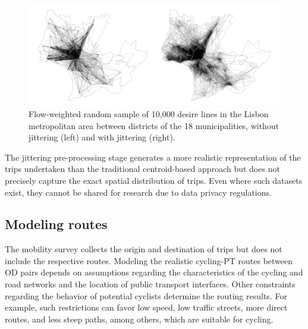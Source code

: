 \documentclass[review, doubleblind, 3p,
authoryear]{elsarticle} %
\begin{document}
\begin{figure}

{\centering \includegraphics[width=1\linewidth,]{img/jitter_new} 

}

\caption{Flow-weighted random sample of 10,000 desire lines in the Lisbon metropolitan area between districts of the 18 municipalities, without jittering (left) and with jittering (right).}\label{fig:jitter}
\end{figure}

The jittering pre-processing stage generates a more realistic
representation of the trips undertaken than the traditional
centroid-based approach but does not precisely capture the exact spatial
distribution of trips. Even where such datasets exist, they cannot be
shared for research due to data privacy regulations.

\subsection{Modeling routes}\label{modeling-routes}

The mobility survey collects the origin and destination of trips but
does not include the respective routes. Modeling the realistic
cycling-PT routes between OD pairs depends on assumptions regarding the
characteristics of the cycling and road networks and the location of
public transport interfaces. Other constraints regarding the behavior of
potential cyclists determine the routing results. For example, such
restrictions can favor low speed, low traffic streets, more direct
routes, and less steep paths, among others, which are suitable for
cycling.
\end{document}
